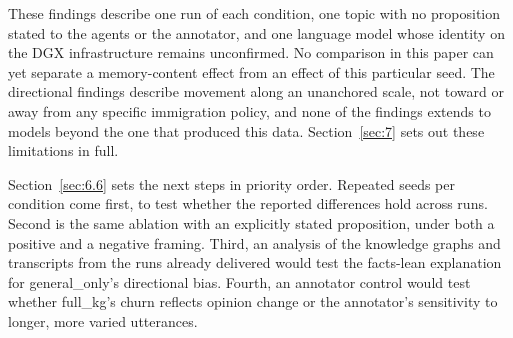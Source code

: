 \documentclass[11pt,a4paper]{article}
\newcommand{\cond}[1]{\textsf{#1}}
\begin{document}
These findings describe one run of each condition, one topic with no proposition stated to the agents or the annotator, and one language model whose identity on the DGX infrastructure remains unconfirmed. No comparison in this paper can yet separate a memory-content effect from an effect of this particular seed. The directional findings describe movement along an unanchored scale, not toward or away from any specific immigration policy, and none of the findings extends to models beyond the one that produced this data. Section~\ref{sec:7} sets out these limitations in full.

Section~\ref{sec:6.6} sets the next steps in priority order. Repeated seeds per condition come first, to test whether the reported differences hold across runs. Second is the same ablation with an explicitly stated proposition, under both a positive and a negative framing. Third, an analysis of the knowledge graphs and transcripts from the runs already delivered would test the facts-lean explanation for \cond{general\_only}'s directional bias. Fourth, an annotator control would test whether \cond{full\_kg}'s churn reflects opinion change or the annotator's sensitivity to longer, more varied utterances.

%
\end{document}
